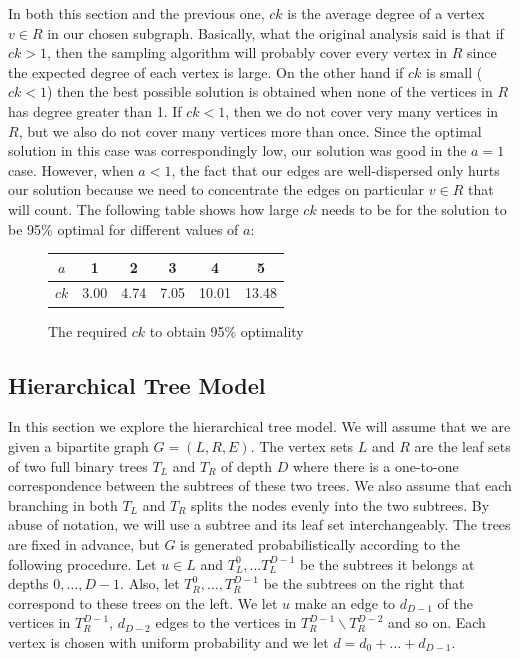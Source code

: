 \documentclass[]{article}
\newcommand{\vs}{\vspace{0.2cm}}
\begin{document}
In both this section and the previous one, $ck$ is the average degree
of a vertex $v\in R$ in our chosen subgraph. Basically, what the
original analysis said is that if $ck>1$, then the sampling algorithm
will probably cover every vertex in $R$ since the expected degree of
each vertex is large. On the other hand if $ck$ is small ($ck < 1$)
then the best possible solution is obtained when none of the vertices
in $R$ has degree greater than 1. If $ck<1$, then we do not cover very
many vertices in $R$, but we also do not cover many vertices more than
once. Since the optimal solution in this case was correspondingly low,
our solution was good in the $a=1$ case. However, when $a<1$, the fact
that our edges are well-dispersed only hurts our solution because we
need to concentrate the edges on particular $v\in R$ that will
count. The following table shows how large $ck$ needs to be for the
solution to be 95\% optimal for different values of $a$:

\begin{figure}[h]
  \centering
  \begin{tabular}{ |c|c|c|c|c|c| }
    \hline
    $a$ & 1 & 2 & 3 & 4 & 5 \\ \hline
    $ck$ & 3.00 & 4.74 & 7.05 & 10.01 & 13.48 \\
    \hline
  \end{tabular}
  \caption{The required $ck$ to obtain 95\% optimality}
\end{figure}

\subsection{Hierarchical Tree Model}
\label{hierarchy}
In this section we explore the hierarchical tree model. We will assume
that we are given a bipartite graph $G=(L,R,E)$. The vertex sets $L$
and $R$ are the leaf sets of two full binary trees $T_L$ and $T_R$ of
depth $D$ where there is a one-to-one correspondence between the
subtrees of these two trees. We also assume that each branching in
both $T_L$ and $T_R$ splits the nodes evenly into the two
subtrees. By abuse of notation, we will use a subtree and its leaf set
interchangeably. The trees are fixed in advance, but $G$ is generated
probabilistically according to the following procedure. Let $u\in L$
and $T_L^0, \ldots T^{D-1}_L$ be the subtrees it belongs at depths
$0,\ldots, D-1$. Also, let $T_R^0,\ldots, T_R^{D-1}$ be the subtrees
on the right that correspond to these trees on the left. We let $u$
make an edge to $d_{D-1}$ of the vertices in $T_{R}^{D-1}$, $d_{D-2}$
edges to the vertices in $T_{R}^{D-1} \backslash T_{R}^{D-2}$ and so
on. Each vertex is chosen with uniform probability and we let $d =
d_{0} + \ldots + d_{D-1}$.\vs
\end{document}
